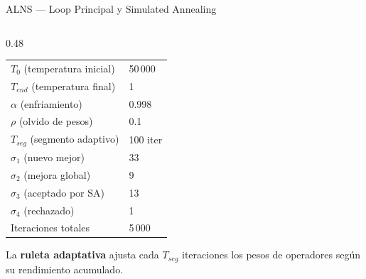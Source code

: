\documentclass[aspectratio=169,10pt]{beamer}
\begin{document}
\begin{frame}{ALNS --- Loop Principal y Simulated Annealing}
\begin{columns}[T,onlytextwidth]
\begin{column}{0.48\textwidth}
\begin{center}
\begin{tabular}{ll}
        $T_0$ (temperatura inicial)    & 50\,000 \\
        $T_{end}$ (temperatura final)  & 1 \\
        $\alpha$ (enfriamiento)        & 0.998 \\
        $\rho$ (olvido de pesos)       & 0.1 \\
        $T_{seg}$ (segmento adaptivo)  & 100 iter \\
        $\sigma_1$ (nuevo mejor)       & 33 \\
        $\sigma_2$ (mejora global)     & 9 \\
        $\sigma_3$ (aceptado por SA)   & 13 \\
        $\sigma_4$ (rechazado)         & 1 \\
        Iteraciones totales            & 5\,000 \\
        \bottomrule
      \end{tabular}
      \end{center}
      \vspace{0.2em}
      \small La \textbf{ruleta adaptativa} ajusta cada $T_{seg}$
      iteraciones los pesos de operadores según su rendimiento acumulado.
    \end{column}
  \end{columns}
\end{frame}
\end{document}
